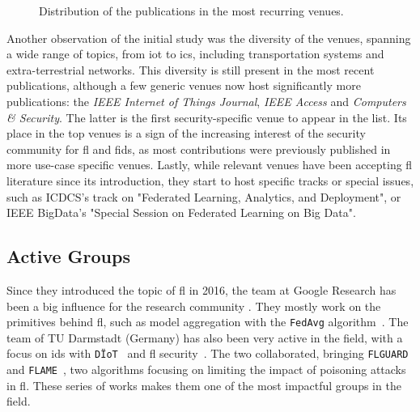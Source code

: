 \begin{figure}
  \centering
  
  \caption{
    Distribution of the publications in the most recurring venues.
    \label{fig:sota.venues}
  }
\end{figure}

Another observation of the initial study was the diversity of the venues, spanning a wide range of topics, from \gls{iot} to \gls{ics}, including transportation systems and extra-terrestrial networks.
This diversity is still present in the most recent publications, although a few generic venues now host significantly more publications: the \emph{IEEE Internet of Things Journal}, \emph{IEEE Access} and \emph{Computers \& Security}.
The latter is the first security-specific venue to appear in the list.
Its place in the top venues is a sign of the increasing interest of the security community for \gls{fl} and \gls{fids}, as most contributions were previously published in more use-case specific venues.
Lastly, while relevant venues have been accepting \gls{fl} literature since its introduction, they start to host specific tracks or special issues, such as ICDCS's track on "Federated Learning, Analytics, and Deployment", or IEEE BigData's "Special Session on Federated Learning on Big Data".


\subsection{Active Groups\label{sec:sota.quanti.authors}}

Since they introduced the topic of \gls{fl} in 2016, the team at Google Research has been a big influence for the research community \cite{konecny_FederatedLearningStrategies_2016,konecny_FederatedOptimizationDistributed_2016,mcmahan_Communicationefficientlearningdeep_2017,bonawitz_PracticalSecureAggregation_2017,bonawitz_FederatedLearningScale_2019}.
They mostly work on the primitives behind \gls{fl}, such as model aggregation with the \texttt{FedAvg} algorithm~\cite{mcmahan_Communicationefficientlearningdeep_2017}.
The team of TU Darmstadt (Germany) has also been very active in the field, with a focus on \gls{ids} with \texttt{DÏoT}~\cite{marchal_AuDIAutonomousIoT_2019,nguyen_DIoTFederatedSelflearning_2019} and \gls{fl} security~\cite{nguyen_PoisoningAttacksFederated_2020b}.
The two collaborated, bringing \texttt{FLGUARD}~\cite{nguyen_FLGUARDSecurePrivate_2021} and \texttt{FLAME}~\cite{nguyen_FLAMETamingBackdoors_2022}, two algorithms focusing on limiting the impact of poisoning attacks in \gls{fl}.
These series of works makes them one of the most impactful groups in the field.

